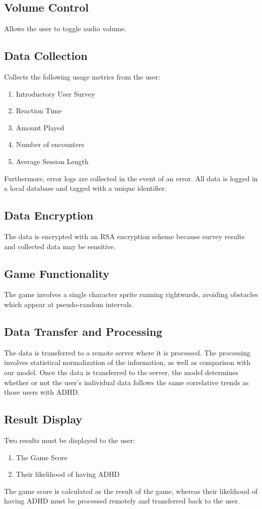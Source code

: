 \documentclass[a4wide]{article}
\begin{document}
\subsection{Volume Control}
Allows the user to toggle audio volume.

\subsection{Data Collection}
Collects the following usage metrics from the user:
\begin{enumerate}
\item Introductory User Survey
\item Reaction Time
\item Amount Played
\item Number of encounters
\item Average Session Length
\end{enumerate}

Furthermore, error logs are collected in the event of an error. All data is
logged in a local database and tagged with a unique identifier.

\subsection{Data Encryption}
The data is encrypted with an RSA encryption scheme because survey results and
collected data may be sensitive.

\subsection{Game Functionality}
The game involves a single character sprite running rightwards, avoiding
obstacles which appear at pseudo-random intervals.

\subsection{Data Transfer and Processing}
The data is transferred to a remote server where it is processed. The processing
involves statistical normalization of the information, as well as comparison
with our model. Once the data is transferred to the server, the model determines
whether or not the user's individual data follows the same correlative trends as
those users with ADHD.

\subsection{Result Display}
Two results must be displayed to the user:
\begin{enumerate}
\item The Game Score
\item Their likelihood of having ADHD
\end{enumerate}
The game score is calculated as the result of the game, whereas their likelihood
of having ADHD must be processed remotely and transferred back to the user.
\end{document}
